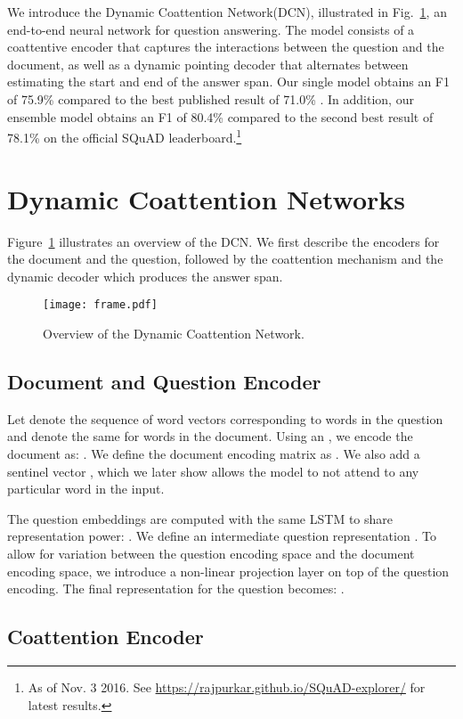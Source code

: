 \documentclass{article} \usepackage{iclr2017_conference,times}
\newcommand{\squad}{SQuAD\xspace}
\newcommand{\ours}{DCN\xspace}
\newcommand{\oursfull}{Dynamic Coattention Network\xspace}
\newcommand{\testf}{80.4}
\newcommand{\testfsingle}{75.9}
\begin{document}
We introduce the \oursfull (\ours), illustrated in Fig.~\ref{fig:overview}, an end-to-end neural network for question answering.
The model consists of a coattentive encoder that captures the interactions between the question and the document, as well as a dynamic pointing decoder that alternates between estimating the start and end of the answer span.
Our single model obtains an F1 of \testfsingle\% compared to the best published result of 71.0\% \citep{Yu2016}. In addition, our ensemble model obtains an F1 of \testf\% compared to the second best result of 78.1\% on the official \squad leaderboard.\footnote{As of Nov. 3 2016. See \url{https://rajpurkar.github.io/SQuAD-explorer/} for latest results.}


\section{Dynamic Coattention Networks}

Figure~\ref{fig:overview} illustrates an overview of the \ours.
We first describe the encoders for the document and the question, followed by the coattention mechanism and the dynamic decoder which produces the answer span.

\begin{figure}[!ht]
\centering
\texttt{[image: frame.pdf]}
\caption{Overview of the \oursfull.}
\label{fig:overview}
\end{figure}


\subsection{Document and Question Encoder}

Let  denote the sequence of word vectors corresponding to words in the question and  denote the same for words in the document.
Using an  \citep{hochreiter1997long}, we encode the document as:
.
We define the document encoding matrix as 
.
We also add a sentinel vector  \citep{Merity2016}, which we later show allows the model to not attend to any particular word in the input.

The question embeddings are computed with the same LSTM to share representation power: .
We define an intermediate question representation .
To allow for variation between the question encoding space and the document encoding space, we introduce a non-linear projection layer on top of the question encoding.
The final representation for the question becomes:
.


\subsection{Coattention Encoder}
\end{document}
